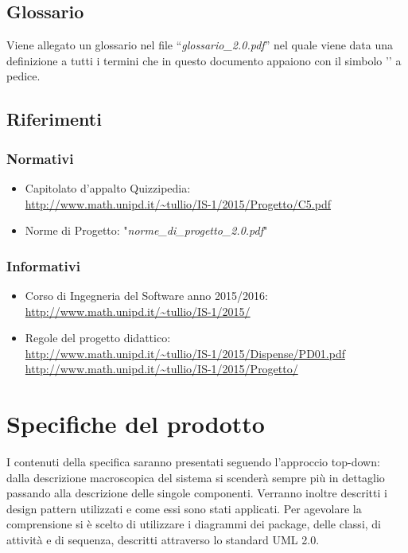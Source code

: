 \documentclass[a4paper,11pt]{article}
\begin{document}
	\subsection{Glossario}
	Viene allegato un glossario nel file ``\textit{glossario\_2.0.pdf}'' nel quale viene data una definizione a tutti i termini che in questo documento appaiono con il simbolo '\addglos' a pedice.
	\subsection{Riferimenti}
		\subsubsection{Normativi}

		\begin{itemize}
			\item Capitolato d'appalto Quizzipedia:\\
			\url{http://www.math.unipd.it/~tullio/IS-1/2015/Progetto/C5.pdf}
			\item Norme di Progetto: "\textit{norme\_di\_progetto\_2.0.pdf}"
		\end{itemize}
		\subsubsection{Informativi}
		\begin{itemize}
			\item Corso di Ingegneria del Software anno 2015/2016:\\
			\url{http://www.math.unipd.it/~tullio/IS-1/2015/}
			\item Regole del progetto didattico:\\
			\url{http://www.math.unipd.it/~tullio/IS-1/2015/Dispense/PD01.pdf}
			\url{http://www.math.unipd.it/~tullio/IS-1/2015/Progetto/}\\
			\end{itemize}
	\pagebreak
	\newpage
	\section{Specifiche del prodotto}
	I contenuti della specifica saranno presentati seguendo l'approccio top-down: dalla descrizione macroscopica del sistema si scenderà sempre più in dettaglio passando alla descrizione delle singole componenti. Verranno inoltre descritti i design pattern utilizzati e come essi sono stati applicati. Per agevolare la comprensione si è scelto di utilizzare i diagrammi dei package, delle classi, di attività e di sequenza, descritti attraverso lo standard UML 2.0.
	
\end{document}
